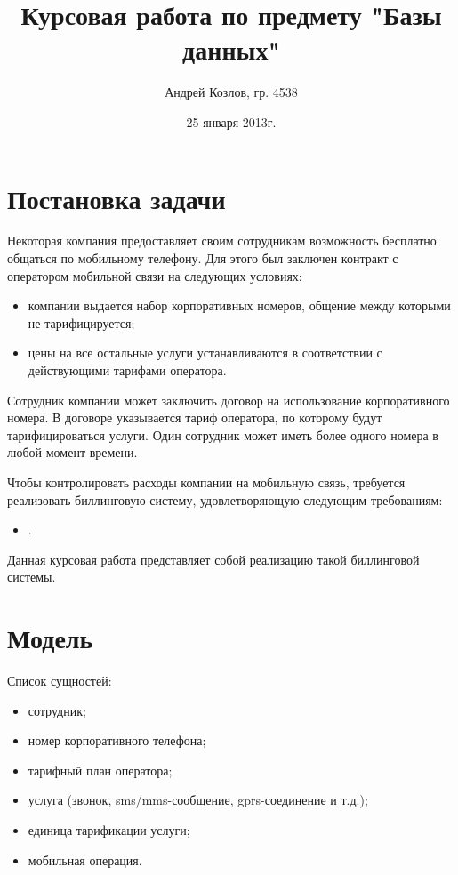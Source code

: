 \documentclass[10pt, a4paper]{article}
\title{Курсовая работа по предмету "Базы данных"}
\author{Андрей Козлов, гр. 4538}
\date{25 января 2013г.}
\begin{document}
\maketitle

\section{Постановка задачи}

Некоторая компания предоставляет своим сотрудникам возможность бесплатно общаться по мобильному телефону. Для этого был заключен контракт с оператором мобильной связи на следующих условиях:
\begin{itemize}
	\item компании выдается набор корпоративных номеров, общение между которыми не тарифицируется;
	\item цены на все остальные услуги устанавливаются в соответствии с действующими тарифами оператора.
\end{itemize}

Сотрудник компании может заключить договор на использование корпоративного номера. В договоре указывается тариф оператора, по которому будут тарифицироваться услуги. Один сотрудник может иметь более одного номера в любой момент времени.

Чтобы контролировать расходы компании на мобильную связь, требуется реализовать биллинговую систему, удовлетворяющую следующим требованиям:
\begin{itemize}
	\item .
\end{itemize}

Данная курсовая работа представляет собой реализацию такой биллинговой системы.

\section{Модель}

Список сущностей:
\begin{itemize}
	\item сотрудник;
	\item номер корпоративного телефона;
	\item тарифный план оператора;
	\item услуга (звонок, sms/mms-сообщение, gprs-соединение и т.д.);
	\item единица тарификации услуги;
	\item мобильная операция.
\end{itemize}
\end{document}
